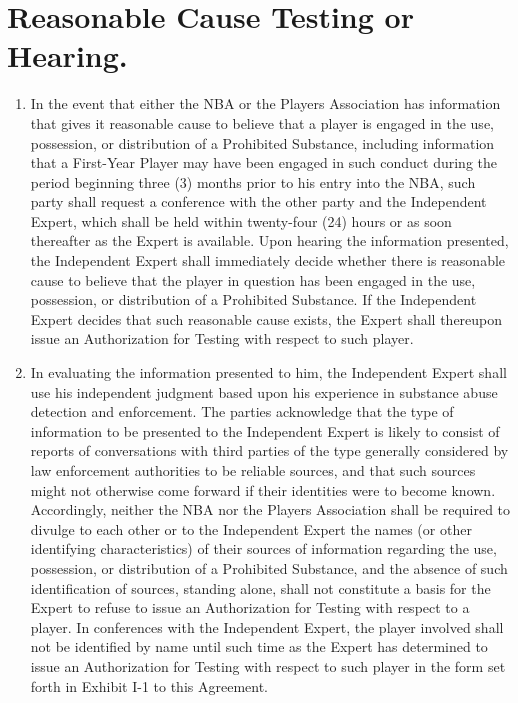 \documentclass[
]{book}
\providecommand{\tightlist}{%
  \setlength{\itemsep}{0pt}\setlength{\parskip}{0pt}}
\begin{document}
\hypertarget{reasonable-cause-testing-or-hearing.}{%
\section{Reasonable Cause Testing or Hearing.}\label{reasonable-cause-testing-or-hearing.}}

\begin{enumerate}
\def\labelenumi{(\alph{enumi})}
\tightlist
\item
  In the event that either the NBA or the Players Association has information that gives it reasonable cause to believe that a player is engaged in the use, possession, or distribution of a Prohibited Substance, including information that a First-Year Player may have been engaged in such conduct during the period beginning three (3) months prior to his entry into the NBA, such party shall request a conference with the other party and the Independent Expert, which shall be held within twenty-four (24) hours or as soon thereafter as the Expert is available. Upon hearing the information presented, the Independent Expert shall immediately decide whether there is reasonable cause to believe that the player in question has been engaged in the use, possession, or distribution of a Prohibited Substance. If the Independent Expert decides that such reasonable cause exists, the Expert shall thereupon issue an Authorization for Testing with respect to such player.
\item
  In evaluating the information presented to him, the Independent Expert shall use his independent judgment based upon his experience in substance abuse detection and enforcement. The parties acknowledge that the type of information to be presented to the Independent Expert is likely to consist of reports of conversations with third parties of the type generally considered by law enforcement authorities to be reliable sources, and that such sources might not otherwise come forward if their identities were to become known. Accordingly, neither the NBA nor the Players Association shall be required to divulge to each other or to the Independent Expert the names (or other identifying characteristics) of their sources of information regarding the use, possession, or distribution of a Prohibited Substance, and the absence of such identification of sources, standing alone, shall not constitute a basis for the Expert to refuse to issue an Authorization for Testing with respect to a player. In conferences with the Independent Expert, the player involved shall not be identified by name until such time as the Expert has determined to issue an Authorization for Testing with respect to such player in the form set forth in Exhibit I-1 to this Agreement.

\end{enumerate}
\end{document}
